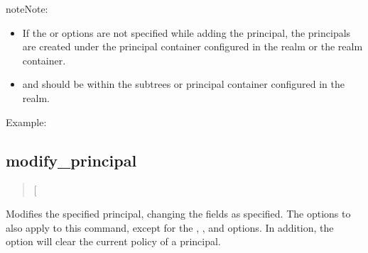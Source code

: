 \documentclass[letterpaper,10pt,english]{sphinxmanual}
\begin{document}
\begin{description}
\begin{sphinxadmonition}{note}{Note:}
\begin{itemize}
\item {} 
If the  or  options are not specified while
adding the principal, the principals are created under the
principal container configured in the realm or the realm
container.

\item {} 
 and  should be within the subtrees or
principal container configured in the realm.

\end{itemize}
\end{sphinxadmonition}

\end{description}

Example:

%
\begin{sphinxVerbatim}[commandchars=\\\{\}]
  
    
   
    
    
  
\end{sphinxVerbatim}


\subsection{modify\_principal}
\label{\detokenize{admin/database:modify-principal}}\begin{quote}

 {[}\sphinxstyleemphasis{options}{]} 
\end{quote}

Modifies the specified principal, changing the fields as specified.
The options to  also apply to this command, except
for the , , and  options.  In addition, the
option  will clear the current policy of a principal.
\end{document}

